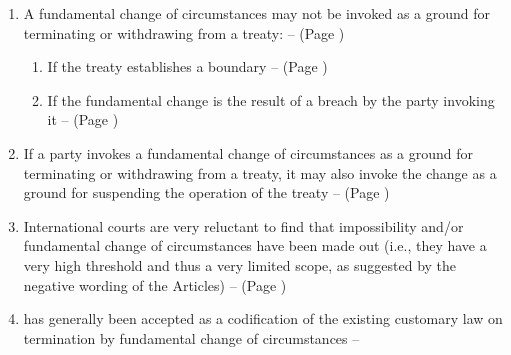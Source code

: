 \begin{enumerate}
\begin{enumerate}[resume]
\begin{enumerate}
            \item A fundamental change of circumstances may not be invoked as a ground for terminating or withdrawing from a treaty: --  (Page \pageref{VCLT Art 62})
            \begin{enumerate}
                \item If the treaty establishes a boundary --  (Page \pageref{VCLT Art 62})
                \item If the fundamental change is the result of a breach by the party invoking it --  (Page \pageref{VCLT Art 62})
            \end{enumerate}
            \item If a party invokes a fundamental change of circumstances as a ground for terminating or withdrawing from a treaty, it may also invoke the change as a ground for suspending the operation of the treaty --  (Page \pageref{VCLT Art 62})
            \item International courts are very reluctant to find that impossibility and/or fundamental change of circumstances have been made out (i.e., they have a very high threshold and thus a very limited scope, as suggested by the negative wording of the Articles) --  (Page \pageref{case:[1997] ICJ Rep 7})
            \item {} has generally been accepted as a codification of the existing customary law on termination by fundamental change of circumstances -- 
        \end{enumerate}
    \end{enumerate}
\end{enumerate}


